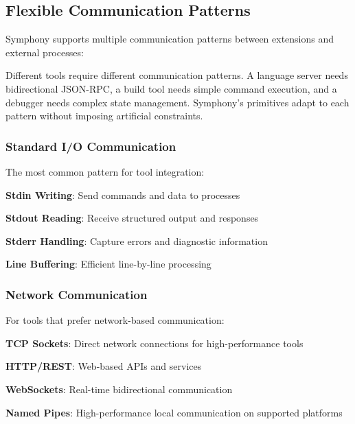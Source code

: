 \subsection*{Flexible Communication Patterns}

Symphony supports multiple communication patterns between extensions and external processes:

\begin{infobox}[title=Communication Pattern Philosophy]
Different tools require different communication patterns. A language server needs bidirectional JSON-RPC, a build tool needs simple command execution, and a debugger needs complex state management. Symphony's primitives adapt to each pattern without imposing artificial constraints.
\end{infobox}

\subsubsection*{Standard I/O Communication}

The most common pattern for tool integration:

\begin{compactlist}
    \item \textbf{Stdin Writing}: Send commands and data to processes
    \item \textbf{Stdout Reading}: Receive structured output and responses
    \item \textbf{Stderr Handling}: Capture errors and diagnostic information
    \item \textbf{Line Buffering}: Efficient line-by-line processing
\end{compactlist}

\subsubsection*{Network Communication}

For tools that prefer network-based communication:

\begin{compactlist}
    \item \textbf{TCP Sockets}: Direct network connections for high-performance tools
    \item \textbf{HTTP/REST}: Web-based APIs and services
    \item \textbf{WebSockets}: Real-time bidirectional communication
    \item \textbf{Named Pipes}: High-performance local communication on supported platforms
\end{compactlist}

